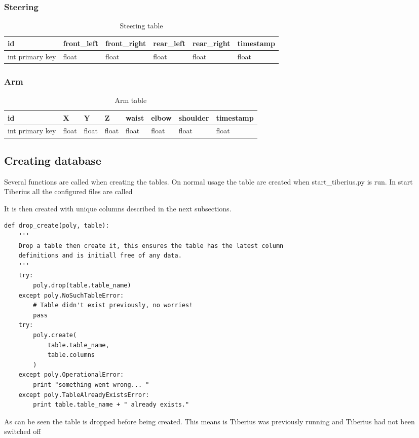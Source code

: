\subsubsection{Steering}
\begin{table}[!htb]
\centering
\caption{Steering table}
\label{tab:db-steering}
\begin{tabular}{@{}llllll@{}}
\toprule
id              & front\_left & front\_right & rear\_left & rear\_right & timestamp \\ \midrule
int primary key & float       & float        & float      & float       & float
\end{tabular}
\end{table}

\subsubsection{Arm}
\begin{table}[!htb]
\centering
\caption{Arm table}
\label{tab:db-arm}
\begin{tabular}{@{}llllllll@{}}
\toprule
id              & X     & Y     & Z     & waist & elbow & shoulder & timestamp \\ \midrule
int primary key & float & float & float & float & float & float    & float
\end{tabular}
\end{table}


\subsection{Creating database}
Several functions are called when creating the tables. On normal usage the table are created when start\_tiberius.py is run. In start Tiberius all the configured files are called




It is then created with unique columns described in the next subsections.

\begin{lstlisting}
def drop_create(poly, table):
    '''
    Drop a table then create it, this ensures the table has the latest column
    definitions and is initiall free of any data.
    '''
    try:
        poly.drop(table.table_name)
    except poly.NoSuchTableError:
        # Table didn't exist previously, no worries!
        pass
    try:
        poly.create(
            table.table_name,
            table.columns
        )
    except poly.OperationalError:
        print "something went wrong... "
    except poly.TableAlreadyExistsError:
        print table.table_name + " already exists."
\end{lstlisting}
As can be seen the table is dropped before being created. This means is Tiberius was previously running and Tiberius had not been switched off

